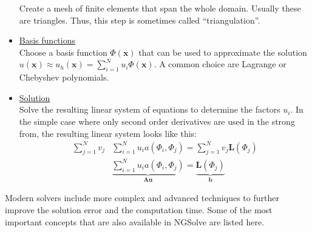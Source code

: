 \documentclass[./\jobname.tex,hidelinks]{subfiles}
\begin{document}
\begin{itemize}
		  Create a mesh of finite elements that span the whole domain. Usually these are triangles. Thus, this step is sometimes called ``triangulation''.
	\item \underline{Basis functions} \\
		  Choose a basis function $\Phi(\mathbf{x})$ that can be used to approximate the solution $u(\mathbf{x}) \approx u_{h}(\mathbf{x}) = \sum_{i = 1}^{N} u_i \Phi(\mathbf{x})$. A common choice are Lagrange or Chebyshev polynomials. 
	\item \underline{Solution} \\
		  Solve the resulting linear system of equations to determine the factors $u_i$. In the simple case where only second order derivatives are used in the strong from, the resulting linear system looks like this: 
		  \begin{equation}
		  \begin{split}
		  \sum_{j=1}^{N} v_j & \sum_{i=1}^{N} u_i a(\Phi_i, \Phi_j) = \sum_{j=1}^{N} v_j \mathbf{L}(\Phi_j) \\
		  & \underbrace{\sum_{i=1}^{N} u_i a(\Phi_i, \Phi_j)}_{\mathbf{A u}} = \underbrace{\mathbf{L}(\Phi_j)}_{\mathbf{b}}
		  \end{split}
		  \end{equation}
\end{itemize}

Modern solvers include more complex and advanced techniques to further improve the solution error and the computation time. Some of the most important concepts that are also available in NGSolve are listed here. 
\end{document}
